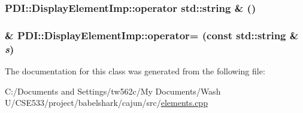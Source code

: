 \hypertarget{class_p_d_i_1_1_display_element_imp_464058c9d80e94581af8532114afb60b}{
\subsubsection[{operator std::string \&}]{\setlength{\rightskip}{0pt plus 5cm}PDI::DisplayElementImp::operator std::string \& ()}}
\label{class_p_d_i_1_1_display_element_imp_464058c9d80e94581af8532114afb60b}


\hypertarget{class_p_d_i_1_1_display_element_imp_58defe0cc1c314ee834673023be19e99}{
\subsubsection[{operator=}]{\& PDI::DisplayElementImp::operator= (const std::string \& {\em s})}}
\label{class_p_d_i_1_1_display_element_imp_58defe0cc1c314ee834673023be19e99}




The documentation for this class was generated from the following file:\begin{CompactItemize}
\item 
C:/Documents and Settings/tw562c/My Documents/Wash U/CSE533/project/babelshark/cajun/src/\hyperlink{elements_8cpp}{elements.cpp}\end{CompactItemize}
